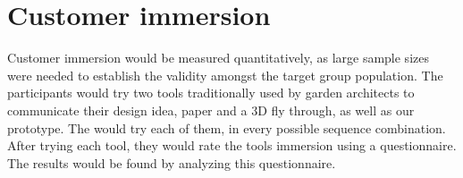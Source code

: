 \section{Customer immersion}
Customer immersion would be measured quantitatively, as large sample sizes were needed to establish the validity amongst the target group population. The participants would try two tools traditionally used by garden architects to communicate their design idea, paper and a 3D fly through, as well as our prototype. The would try each of them, in every possible sequence combination. After trying each tool, they would rate the tools immersion using a questionnaire. The results would be found by analyzing this questionnaire.